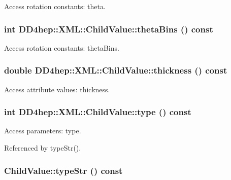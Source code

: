 Access rotation constants: theta. \hypertarget{struct_d_d4hep_1_1_x_m_l_1_1_child_value_a1e42f8a32e0aab1712bd571cf1219d3e}{
\subsubsection[{thetaBins}]{\setlength{\rightskip}{0pt plus 5cm}int DD4hep::XML::ChildValue::thetaBins () const}}
\label{struct_d_d4hep_1_1_x_m_l_1_1_child_value_a1e42f8a32e0aab1712bd571cf1219d3e}


Access rotation constants: thetaBins. \hypertarget{struct_d_d4hep_1_1_x_m_l_1_1_child_value_a3647a99e18716de163f51135aad2c070}{
\subsubsection[{thickness}]{\setlength{\rightskip}{0pt plus 5cm}double DD4hep::XML::ChildValue::thickness () const}}
\label{struct_d_d4hep_1_1_x_m_l_1_1_child_value_a3647a99e18716de163f51135aad2c070}


Access attribute values: thickness. \hypertarget{struct_d_d4hep_1_1_x_m_l_1_1_child_value_aee3e2b048dccfdd1fa8c139e12763c36}{
\subsubsection[{type}]{\setlength{\rightskip}{0pt plus 5cm}int DD4hep::XML::ChildValue::type () const}}
\label{struct_d_d4hep_1_1_x_m_l_1_1_child_value_aee3e2b048dccfdd1fa8c139e12763c36}


Access parameters: type. 

Referenced by typeStr().\hypertarget{struct_d_d4hep_1_1_x_m_l_1_1_child_value_abb3c6a8a0a2bf4707708900657440d73}{
\subsubsection[{typeStr}]{ ChildValue::typeStr () const}}
\label{struct_d_d4hep_1_1_x_m_l_1_1_child_value_abb3c6a8a0a2bf4707708900657440d73}


